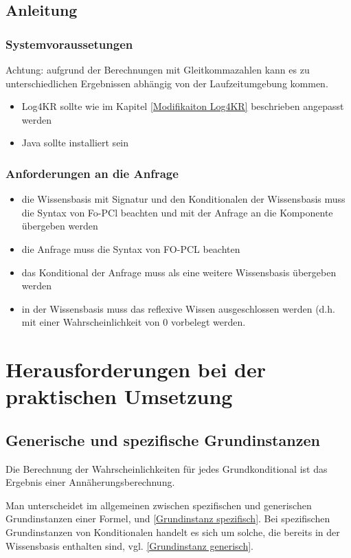 \documentclass[a4paper, 11pt]{book}
\begin{document}
{\begin{itemize}
\end{itemize}


\section{Anleitung}
\subsection{Systemvoraussetungen}
Achtung: aufgrund der Berechnungen mit Gleitkommazahlen kann es zu unterschiedlichen Ergebnissen abhängig von der Laufzeitumgebung kommen. 
\begin{itemize}
	\item Log4KR sollte wie im Kapitel \ref{Modifikaiton Log4KR} beschrieben angepasst werden
	\item Java sollte installiert sein
\end{itemize}
\subsection{Anforderungen an die Anfrage}
\begin{itemize}
	\item die Wissensbasis mit Signatur und den Konditionalen der Wissensbasis muss die Syntax von Fo-PCl beachten und mit der Anfrage an die Komponente übergeben werden
	\item die Anfrage muss die Syntax von FO-PCL beachten
	\item das Konditional der Anfrage muss als eine weitere Wissensbasis übergeben werden
	\item in der Wissensbasis muss das reflexive Wissen ausgeschlossen werden (d.h. mit einer Wahrscheinlichkeit von 0 vorbelegt werden. 
\end{itemize}

\chapter{Herausforderungen bei der praktischen Umsetzung}
\section{Generische und spezifische Grundinstanzen}
Die Berechnung der Wahrscheinlichkeiten für jedes Grundkonditional ist das Ergebnis einer Annäherungsberechnung.

Man unterscheidet im allgemeinen zwischen spezifischen und generischen Grundinstanzen einer Formel,   und \ref{Grundinstanz spezifisch}.
Bei spezifischen Grundinstanzen von Konditionalen handelt es sich um solche, die bereits in der Wissensbasis enthalten sind, vgl. \ref{Grundinstanz generisch}. 

}
\end{document}
